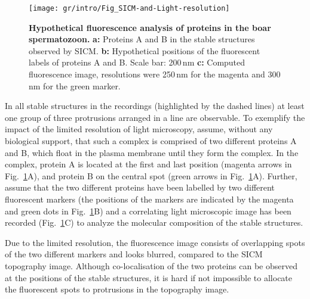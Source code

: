 \begin{figure}
  \sidecaption
  \texttt{[image: gr/intro/Fig\_SICM-and-Light-resolution]}%
  \caption{\textbf{Hypothetical fluorescence analysis of proteins in the boar
      spermatozoon.} \textbf{a:} Proteins A and B in the stable structures
    observed by SICM. \textbf{b:} Hypothetical positions of the fluorescent
    labels of proteins A and B. Scale bar: 200\,nm \textbf{c:} Computed
    fluorescence image, resolutions were 250\,nm for the magenta and 300\,nm
    for the green marker.}
  \label{fig:sicm-and-light-resolution}
\end{figure}
In all stable structures in the recordings (highlighted by the dashed lines)
at least one group of three protrusions arranged in a line are observable. To
exemplify the impact of the limited resolution of light microscopy, assume,
without any biological support, that such a complex is comprised of two
different proteins A and B, which float in the plasma membrane until they form
the complex. In the complex, protein A is located at the first and last
position (magenta arrows in Fig.~\ref{fig:sicm-and-light-resolution}A), and
protein B on the central spot (green arrows in
Fig.~\ref{fig:sicm-and-light-resolution}A). Further, assume that the two
different proteins have been labelled by two different fluorescent markers
(the positions of the markers are indicated by the magenta and green dots in
Fig.~\ref{fig:sicm-and-light-resolution}B) and a correlating light microscopic
image has been recorded (Fig.~\ref{fig:sicm-and-light-resolution}C) to analyze
the molecular composition of the stable structures.

Due to the limited resolution, the fluorescence image consists of overlapping
spots of the two different markers and looks blurred, compared to the
SICM topography image. Although co-localisation of the two proteins can be
observed at the positions of the stable structures, it is hard if not
impossible to allocate the fluorescent spots to protrusions in the topography
image.


